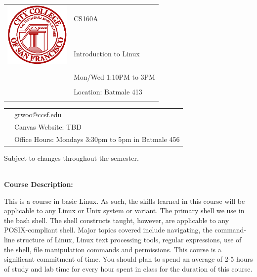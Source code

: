 \documentclass[11pt]{article}
\begin{document}
\begin{tabular}{ l l }
  \multirow{3}{*}{\includegraphics[height=1.25in,width=1.25in]{logo_ccsf.png}} & \LARGE CS160A \\\\
                                                                             & \LARGE Introduction to Linux \\\\
  & \LARGE Mon/Wed 1:10PM to 3PM \\\\
  & \LARGE Location: Batmale 413\\\\
\end{tabular}
\vspace{10mm}

\begin{tabular}{ l l }
  & \large grwoo@ccsf.edu \\
  & \large Canvas Website: TBD \\
  & \large Office Hours:  Mondays 3:30pm to 5pm in Batmale 456\\
\end{tabular}
\vspace{5mm}
\begin{center} Subject to changes throughout the semester.\\
\end{center}

\textbf {\large \\ Course Description:}

This is a course in basic Linux. As such, the skills learned in this course
will be applicable to any Linux or Unix system or variant. The primary shell we
use in the bash shell. The shell constructs taught, however, are applicable to
any POSIX-compliant shell. Major topics covered include navigating, the
command-line structure of Linux, Linux text processing tools, regular
expressions, use of the shell, file manipulation commands and permissions.
This course is a significant commitment of time. You should plan to spend an
average of 2-5 hours of study and lab time for every hour spent in class for
the duration of this course.\\
\end{document}
